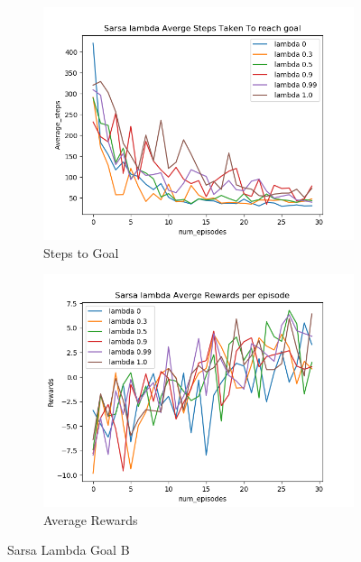 \documentclass[12pt, letterpaper, twoside]{report}
\begin{document}
\begin{figure}[h!]
  \centering
  \begin{subfigure}[b]{0.6\linewidth}
    \includegraphics[width=\linewidth]{Sarasa_labda_goal_B_steps.png}
    \caption{Steps to Goal}
  \end{subfigure}
  \begin{subfigure}[b]{0.6\linewidth}
    \includegraphics[width=\linewidth]{Sarasa_labda_goal_B_return.png}
    \caption{Average Rewards}
  \end{subfigure}
  \caption{Sarsa Lambda Goal B}
  \label{fig:Softamx}
\end{figure}
\end{document}
